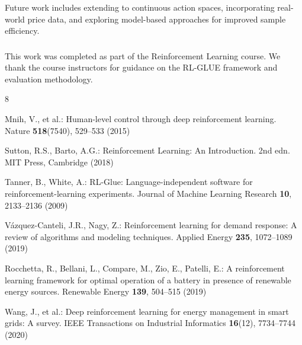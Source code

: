 \documentclass[runningheads]{llncs}
\begin{document}
Future work includes extending to continuous action spaces, incorporating real-world price data, and exploring model-based approaches for improved sample efficiency.

\begin{credits}
\subsubsection{\ackname} This work was completed as part of the Reinforcement Learning course. We thank the course instructors for guidance on the RL-GLUE framework and evaluation methodology.
\end{credits}

\begin{thebibliography}{8}

Mnih, V., et al.: Human-level control through deep reinforcement learning. Nature \textbf{518}(7540), 529--533 (2015)

Sutton, R.S., Barto, A.G.: Reinforcement Learning: An Introduction. 2nd edn. MIT Press, Cambridge (2018)

Tanner, B., White, A.: RL-Glue: Language-independent software for reinforcement-learning experiments. Journal of Machine Learning Research \textbf{10}, 2133--2136 (2009)

V\'{a}zquez-Canteli, J.R., Nagy, Z.: Reinforcement learning for demand response: A review of algorithms and modeling techniques. Applied Energy \textbf{235}, 1072--1089 (2019)

Rocchetta, R., Bellani, L., Compare, M., Zio, E., Patelli, E.: A reinforcement learning framework for optimal operation of a battery in presence of renewable energy sources. Renewable Energy \textbf{139}, 504--515 (2019)

Wang, J., et al.: Deep reinforcement learning for energy management in smart grids: A survey. IEEE Transactions on Industrial Informatics \textbf{16}(12), 7734--7744 (2020)

\end{thebibliography}
\end{document}
